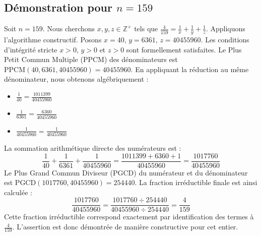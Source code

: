 \documentclass[11pt,a4paper]{article}
\begin{document}
\subsection{Démonstration pour $n = 159$}
Soit $n = 159$. Nous cherchons $x, y, z \in \mathbb{Z}^{+}$ tels que $\frac{4}{159} = \frac{1}{x} + \frac{1}{y} + \frac{1}{z}$.
Appliquons l'algorithme constructif. Posons $x = 40$, $y = 6361$, $z = 40455960$.
Les conditions d'intégrité stricte $x > 0$, $y > 0$ et $z > 0$ sont formellement satisfaites.
Le Plus Petit Commun Multiple (PPCM) des dénominateurs est $\text{PPCM}(40, 6361, 40455960) = 40455960$.
En appliquant la réduction au même dénominateur, nous obtenons algébriquement :
\begin{itemize}
    \item $\frac{1}{40} = \frac{1011399}{40455960}$
    \item $\frac{1}{6361} = \frac{6360}{40455960}$
    \item $\frac{1}{40455960} = \frac{1}{40455960}$
\end{itemize}
La sommation arithmétique directe des numérateurs est :
$$ \frac{1}{40} + \frac{1}{6361} + \frac{1}{40455960} = \frac{1011399 + 6360 + 1}{40455960} = \frac{1017760}{40455960} $$
Le Plus Grand Commun Diviseur (PGCD) du numérateur et du dénominateur est $\text{PGCD}(1017760, 40455960) = 254440$.
La fraction irréductible finale est ainsi calculée :
$$ \frac{1017760}{40455960} = \frac{1017760 \div 254440}{40455960 \div 254440} = \frac{4}{159} $$
Cette fraction irréductible correspond exactement par identification des termes à $\frac{4}{159}$. L'assertion est donc démontrée de manière constructive pour cet entier.
\end{document}
